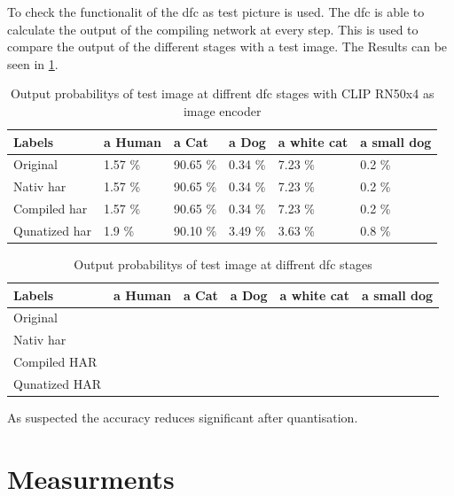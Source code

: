 To check the functionalit of the \acrshort{dfc} as test picture is used.
The \acrshort{dfc} is able to calculate the output of the compiling network at every step.
This is used to compare the output of the different stages with a test image.
The Results can be seen in \cref{tab:methods:clipcompare}.

\begin{table}[]
    \centering
    \begin{tabular}{llllll}
    \hline
    Labels        & a Human & a Cat   & a Dog  & a white cat & a small dog \\ \hline
    Original      & 1.57 \%  & 90.65 \% & 0.34 \% & 7.23 \%      & 0.2 \%       \\
    Nativ \acrshort{har}        & 1.57 \%  & 90.65 \% & 0.34 \% & 7.23 \%      & 0.2 \%       \\
    Compiled \acrshort{har}     & 1.57 \%  & 90.65 \% & 0.34 \% & 7.23 \%      & 0.2 \%       \\
    Qunatized \acrshort{har}    & 1.9 \%   & 90.10 \% & 3.49 \% & 3.63 \%      & 0.8 \%       \\ \hline
    \end{tabular}
    \caption{Output probabilitys of test image at diffrent \acrshort{dfc} stages with CLIP RN50x4 as image encoder}
    \label{tab:methods:clipcompare}
\end{table}

\begin{table}
    \centering
    \begin{tabular}{llllll}
    \hline
    Labels        & a Human & a Cat & a Dog & a white cat & a small dog \\ \hline
    Original      &         &       &       &             &             \\
    Nativ \acrshort{har}     &         &       &       &             &             \\
    Compiled HAR  &         &       &       &             &             \\
    Qunatized HAR &         &       &       &             &                   
    \end{tabular}
    \caption{Output probabilitys of test image at diffrent \acrshort{dfc} stages
    \label{tab:methods:tinyclipcompare}}
\end{table}

As suspected the accuracy reduces significant after quantisation.


\section{Measurments}


